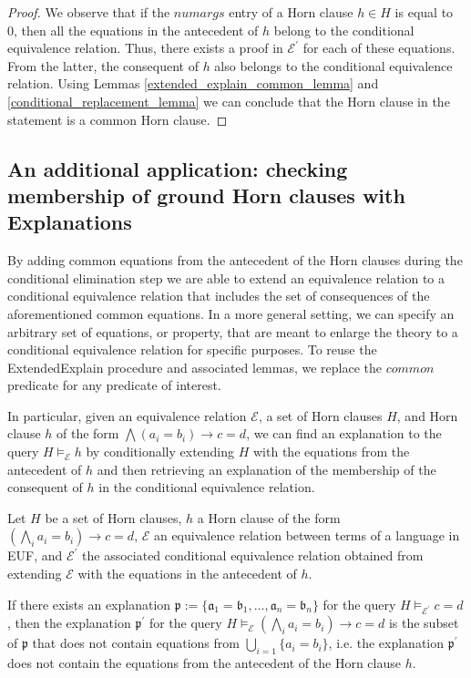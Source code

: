   \begin{proof}
    We observe that if the $numargs$ entry of a Horn clause
    $h \in H$ is equal to 0, then 
    all the equations in the antecedent of $h$ belong 
    to the conditional equivalence relation. Thus, 
    there exists a proof in $\mathcal{E^{'}}$ for
    each of these equations. From the latter, the consequent
    of $h$ also belongs to the conditional equivalence
    relation. Using Lemmas \ref{extended_explain_common_lemma}
    and \ref{conditional_replacement_lemma} we can conclude that
    the Horn clause in the statement is a common Horn clause.
  \end{proof}

  \subsection{An additional application: checking
    membership of ground Horn clauses 
  with Explanations}

  By adding common equations
  from the antecedent of the Horn clauses during the 
  conditional elimination step we are able to 
  extend an equivalence relation to a conditional
  equivalence relation that includes the set 
  of consequences of the aforementioned common equations.
  In a more general setting, we can specify an arbitrary
  set of equations, or property, 
  that are meant to enlarge the theory
  to a conditional equivalence relation for 
  specific purposes. To reuse the ExtendedExplain
  procedure and associated lemmas, we replace the $common$
  predicate for any predicate of interest.

  In particular, given an equivalence relation $\mathcal{E}$, a 
  set of Horn clauses $H$, and Horn clause $h$ of the form 
  $\bigwedge (a_i = b_i) \rightarrow c = d$, we can 
  find an explanation to the query $H \models_{\mathcal{E}} h$
  by conditionally extending $H$ with the equations
  from the antecedent of $h$ and then retrieving an explanation
  of the membership of the consequent of $h$ in the conditional 
  equivalence relation.

  \begin{lemma}
    Let $H$ be a set of Horn clauses, $h$ a Horn clause of the
    form $(\bigwedge_i a_i = b_i) \rightarrow c = d$, 
    $\mathcal{E}$ an equivalence relation between terms 
    of a language in EUF, and $\mathcal{E^{'}}$ the associated
    conditional equivalence relation obtained from extending
    $\mathcal{E}$ with the equations in the antecedent of $h$.

    If there exists an explanation 
    $\mathfrak{p} := \{\mathfrak{a}_1 = \mathfrak{b}_1,
    \dots, \mathfrak{a}_n = \mathfrak{b}_n\}$ 
    for the query $H \models_{\mathcal{E^{'}}} c = d$,
    then the explanation $\mathfrak{p^{'}}$ for the query 
    $H \models_{\mathcal{E}} (\bigwedge_i a_i = b_i) 
    \rightarrow c = d$ is the subset of $\mathfrak{p}$
    that does not contain equations from 
    $\bigcup_{i=1}\{a_i = b_i\}$, i.e. the 
    explanation $\mathfrak{p^{'}}$ does not contain 
    the equations from the antecedent of the Horn clause
    $h$.

  \end{lemma}

